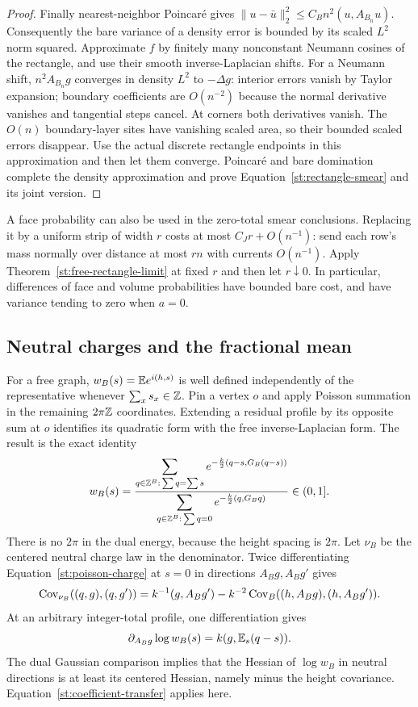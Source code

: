 \begin{proof}
Finally nearest-neighbor Poincar\'e gives
$\|u-\bar u\|_2^2\le C_Bn^2(u,A_{B_n}u)$. Consequently the bare variance
of a density error is bounded by its scaled $L^2$ norm squared. Approximate
$f$ by finitely many nonconstant Neumann cosines of the rectangle, and
use their smooth inverse-Laplacian shifts. For a Neumann shift,
$n^2A_{B_n}g$ converges in density $L^2$ to $-\Delta g$: interior errors
vanish by Taylor expansion; boundary coefficients are $O(n^{-2})$ because
the normal derivative vanishes and tangential steps cancel. At corners
both derivatives vanish. The $O(n)$ boundary-layer sites have vanishing
scaled area, so their bounded scaled errors disappear. Use the actual
discrete rectangle endpoints in this approximation and then let them
converge. Poincar\'e and bare domination complete the density approximation
and prove Equation~\eqref{st:rectangle-smear} and its joint version.
\end{proof}

A face probability can also be used in the zero-total smear conclusions.
Replacing it by a uniform strip of width $r$ costs at most $C_Jr+O(n^{-1})$:
send each row's mass normally over distance at most $rn$ with currents
$O(n^{-1})$. Apply Theorem~\ref{st:free-rectangle-limit} at fixed $r$ and
then let $r\downarrow0$. In particular, differences of face and volume
probabilities have bounded bare cost, and have variance tending to zero
when $a=0$.
\subsection{Neutral charges and the fractional mean}

For a free graph, $w_B(s)=\mathbb E e^{i(h,s)}$ is well defined independently of
the representative whenever $\sum_xs_x\in\mathbb Z$. Pin a vertex $o$ and apply
Poisson summation in the remaining $2\pi\mathbb Z$ coordinates. Extending a
residual profile by its opposite sum at $o$ identifies its quadratic form
with the free inverse-Laplacian form. The result is the exact identity
\begin{equation}\label{st:poisson-charge}
 w_B(s)=
 \frac{\displaystyle\sum_{q\in\mathbb Z^B:\,\sum q=\sum s}
       e^{-\frac k2(q-s,G_B(q-s))}}
      {\displaystyle\sum_{q\in\mathbb Z^B:\,\sum q=0}
       e^{-\frac k2(q,G_Bq)}}\in(0,1].
\end{equation}
There is no $2\pi$ in the dual energy, because the height spacing is $2\pi$.
Let $\nu_B$ be the centered neutral charge law in the denominator. Twice
differentiating Equation~\eqref{st:poisson-charge} at $s=0$ in directions
$A_Bg,A_Bg'$ gives
\begin{equation}\label{st:dual-covariance}
 \operatorname{Cov}_{\nu_B}((q,g),(q,g'))
 =k^{-1}(g,A_Bg')-k^{-2}\operatorname{Cov}_B((h,A_Bg),(h,A_Bg')).
\end{equation}
At an arbitrary integer-total profile, one differentiation gives
\begin{equation}\label{st:dual-mean}
 \partial_{A_Bg}\log w_B(s)
       =k(g,\mathbb E_s(q-s)).
\end{equation}
The dual Gaussian comparison implies that the Hessian of $\log w_B$ in
neutral directions is at least its centered Hessian, namely minus the
height covariance. Equation~\eqref{st:coefficient-transfer} applies here.

